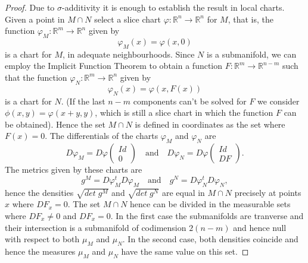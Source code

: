 \documentclass[%
 aip,
 amsmath,amssymb,
 reprint,%
jmp]{revtex4-2}
\begin{document}
\begin{proof}
Due to $\sigma$-additivity it is enough to establish the result in local charts. Given a point in $M\cap N$ select a slice chart $\varphi\colon \mathbb{R}^{n} \to \mathbb{R}^{n}$ for $M$, that is,
the function $\varphi_{M}\colon \mathbb{R}^{m} \to \mathbb{R}^{n}$ given by
\begin{equation*}
    \varphi_{M}(x) = \varphi(x,0)
\end{equation*}
is a chart for $M$, in adequate neighbourhoods. Since $N$ is a submanifold, we can employ the Implicit Function Theorem to obtain a function $F\colon \mathbb{R}^{m} \to \mathbb{R}^{n-m}$ such that the function $\varphi_{N}\colon \mathbb{R}^{m} \to \mathbb{R}^{n}$ given by
\begin{equation*}
    \varphi_{N}(x) = \varphi(x,F(x))
\end{equation*}
is a chart for $N$. (If the last $n-m$ components can't be solved for $F$ we consider $\phi(x,y) = \varphi(x+y,y)$, which is still a slice chart in which the function $F$ can be obtained). Hence the set $M\cap N$ is defined in coordinates as the set where $F(x) = 0$. The differentials of the charts $\varphi_{M}$ and $\varphi_{N}$ are
\begin{equation*}
    D\varphi_{M} = D\varphi
    \left(\begin{array}{c}
         Id \\
          0
    \end{array}\right)
    \quad\text{and}\quad D\varphi_{N} = D\varphi
    \left(\begin{array}{c}
         Id \\
          DF
    \end{array}\right).
\end{equation*}
The metrics given by these charts are
\begin{equation*}
    g^{M} = D\varphi_{M}^{t} D\varphi_{M} \quad\text{and}\quad g^{N} = D\varphi_{N}^{t} D\varphi_{N},
\end{equation*}
hence the densities $\sqrt{det\;g^{M}}$ and $\sqrt{det\;g^{N}}$ are equal in $M\cap N$ precisely at points $x$ where $DF_{x} = 0$. The set $M\cap N$ hence can be divided in the measurable sets where $DF_{x} \neq 0$ and $DF_{x} = 0$. In the first case the submanifolds are tranverse and their intersection is a submanifold of codimension $2(n - m)$ and hence null with respect to both $\mu_{M}$ and $\mu_{N}$. In the second case, both densities coincide and hence the measures $\mu_{M}$ and $\mu_{N}$ have the same value on this set.
\end{proof}
\end{document}
